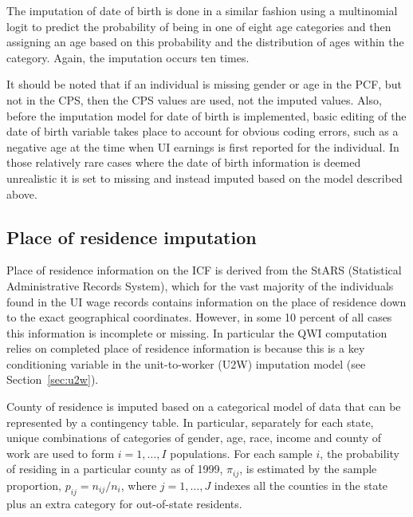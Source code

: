 The  imputation of date of birth is done in a similar fashion using a multinomial logit
to predict the probability of being in one of eight age categories and then
assigning an age based on this probability and the distribution of ages
within the category. Again, the imputation occurs ten times.

It should be noted that if an individual is missing gender or age in the
PCF, but not in the CPS, then the CPS values are used, not the imputed
values. Also, before the imputation model for date of birth is implemented,
basic editing of the date of birth variable takes place to account for
obvious coding errors, such as a negative age at the time when UI earnings
is first reported for the individual. In those relatively rare cases where
the date of birth information is deemed unrealistic it is set to missing
and instead imputed based on the model described above.

\subsection{Place of residence imputation}
\label{sec:icf:place_impute}

Place of residence information on the ICF is derived from the StARS
(Statistical Administrative Records System), which for the vast majority of
the individuals found in the UI wage records contains information on the
place of residence down to the exact geographical coordinates. However, in
some 10 
percent of all cases this information is incomplete or missing. In
particular the  QWI computation relies on completed place of residence
information is because this is a key conditioning variable in the
unit-to-worker (U2W) imputation model (see Section~\ref{sec:u2w}). 



County of residence is imputed based on a categorical model of data that
can be represented by a contingency table. In particular, separately for
each state, unique combinations of categories of gender, age, race, income
and county of work are used to form $i=1,\ldots ,I$ populations. For each
sample $i$, the probability of residing in a particular county as of 1999,
$\pi_{ij}$, is estimated by the sample proportion, $p_{ij}=n_{ij}/n_{i}$,
where $j=1,\ldots ,J$ indexes all the counties in the state plus an extra
category for out-of-state residents.

